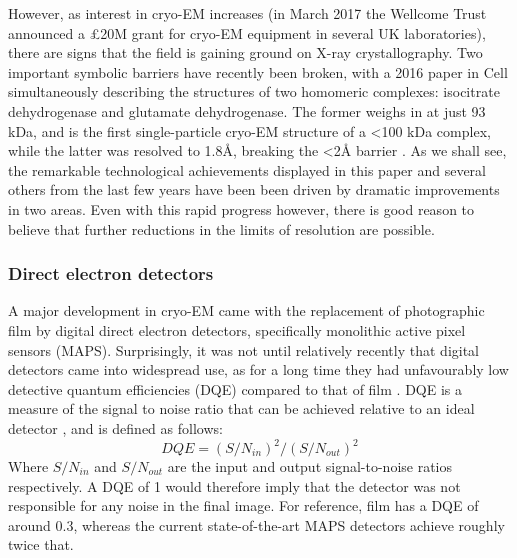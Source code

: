 \documentclass[a4paper,11pt,twoside,openright]{scrbook}
\begin{document}
However, as interest in cryo-EM increases (in March 2017 the Wellcome Trust announced a £20M grant for cryo-EM equipment in several UK laboratories), there are signs that the field is gaining ground on X-ray crystallography. Two important symbolic barriers have recently been broken, with a 2016 paper in Cell simultaneously describing the structures of two homomeric complexes: isocitrate dehydrogenase and glutamate dehydrogenase. The former weighs in at just 93 kDa, and is the first single-particle cryo-EM structure of a <100 kDa complex, while the latter was resolved to 1.8Å, breaking the <2Å barrier \cite{Merk2016}. As we shall see, the remarkable technological achievements displayed in this paper and several others from the last few years have been been driven by dramatic improvements in two areas\cite{Bai2015}. Even with this rapid progress however, there is good reason to believe that further reductions in the limits of resolution are possible.

\subsubsection{Direct electron detectors}
A major development in cryo-EM came with the replacement of photographic film by digital direct electron detectors, specifically monolithic active pixel sensors (MAPS). Surprisingly, it was not until relatively recently that digital detectors came into widespread use, as for a long time they had unfavourably low detective quantum efficiencies (DQE) compared to that of film \cite{McMullan2009}. DQE is a measure of the signal to noise ratio that can be achieved relative to an ideal detector \cite{Dainty1975}, and is defined as follows:
\begin{displaymath}
    DQE = (S/N_{in})^{2}/(S/N_{out})^{2}
\end{displaymath}
Where \begin{math} S/N_{in} \end{math} and \begin{math} S/N_{out} \end{math} are the input and output signal-to-noise ratios respectively. A DQE of 1 would therefore imply that the detector was not responsible for any noise in the final image. For reference, film has a DQE of around 0.3, whereas the current state-of-the-art MAPS detectors achieve roughly twice that.
\end{document}
